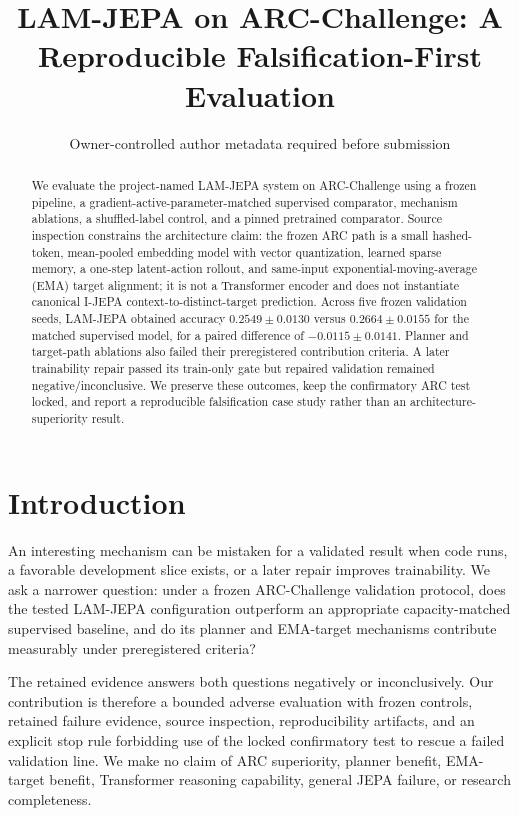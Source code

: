 \documentclass[conference]{IEEEtran}
\title{LAM-JEPA on ARC-Challenge: A Reproducible Falsification-First Evaluation}
\author{Owner-controlled author metadata required before submission}
\begin{document}
\maketitle

\begin{abstract}
We evaluate the project-named LAM-JEPA system on ARC-Challenge using a frozen pipeline, a gradient-active-parameter-matched supervised comparator, mechanism ablations, a shuffled-label control, and a pinned pretrained comparator. Source inspection constrains the architecture claim: the frozen ARC path is a small hashed-token, mean-pooled embedding model with vector quantization, learned sparse memory, a one-step latent-action rollout, and same-input exponential-moving-average (EMA) target alignment; it is not a Transformer encoder and does not instantiate canonical I-JEPA context-to-distinct-target prediction. Across five frozen validation seeds, LAM-JEPA obtained accuracy $0.2549\pm0.0130$ versus $0.2664\pm0.0155$ for the matched supervised model, for a paired difference of $-0.0115\pm0.0141$. Planner and target-path ablations also failed their preregistered contribution criteria. A later trainability repair passed its train-only gate but repaired validation remained negative/inconclusive. We preserve these outcomes, keep the confirmatory ARC test locked, and report a reproducible falsification case study rather than an architecture-superiority result.
\end{abstract}

\section{Introduction}
An interesting mechanism can be mistaken for a validated result when code runs, a favorable development slice exists, or a later repair improves trainability. We ask a narrower question: under a frozen ARC-Challenge validation protocol, does the tested LAM-JEPA configuration outperform an appropriate capacity-matched supervised baseline, and do its planner and EMA-target mechanisms contribute measurably under preregistered criteria?

The retained evidence answers both questions negatively or inconclusively. Our contribution is therefore a bounded adverse evaluation with frozen controls, retained failure evidence, source inspection, reproducibility artifacts, and an explicit stop rule forbidding use of the locked confirmatory test to rescue a failed validation line. We make no claim of ARC superiority, planner benefit, EMA-target benefit, Transformer reasoning capability, general JEPA failure, or research completeness.
\end{document}
